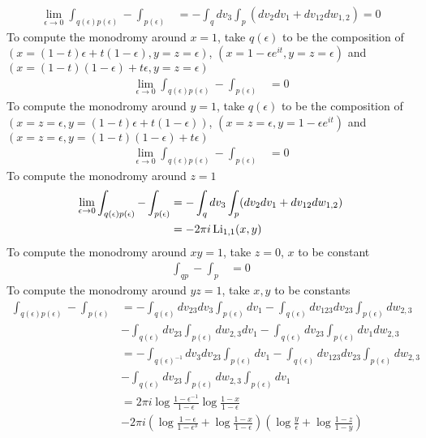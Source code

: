 \documentclass[main]{subfiles}
\begin{document}
\begin{align*}
\lim_{\epsilon\to0}\int_{q(\epsilon)p(\epsilon)}-\int_{p(\epsilon)}&=-\int_qdv_3\int_p(dv_2dv_1+dv_{12}dw_{1,2})=0
\end{align*}
To compute the monodromy around $x=1$, take $q(\epsilon)$ to be the composition of $(x=(1-t)\epsilon+t(1-\epsilon),y=z=\epsilon)$, $(x=1-\epsilon e^{it},y=z=\epsilon)$ and $(x=(1-t)(1-\epsilon)+t\epsilon,y=z=\epsilon)$
\begin{align*}
\lim_{\epsilon\to0}\int_{q(\epsilon)p(\epsilon)}-\int_{p(\epsilon)}&=0
\end{align*}
To compute the monodromy around $y=1$, take $q(\epsilon)$ to be the composition of $(x=z=\epsilon,y=(1-t)\epsilon+t(1-\epsilon))$, $(x=z=\epsilon,y=1-\epsilon e^{it})$ and $(x=z=\epsilon,y=(1-t)(1-\epsilon)+t\epsilon)$
\begin{align*}
\lim_{\epsilon\to0}\int_{q(\epsilon)p(\epsilon)}-\int_{p(\epsilon)}&=0
\end{align*}
To compute the monodromy around $z=1$
\begin{align*}
\lim_{\epsilon\to0}\int_{q(\epsilon)p(\epsilon)}-\int_{p(\epsilon)}&=-\int_qdv_3\int_p(dv_2dv_1+dv_{12}dw_{1,2}) \\
&=-2\pi i\operatorname{Li}_{1,1}(x,y)
\end{align*}
To compute the monodromy around $xy=1$, take $z=0$, $x$ to be constant
\begin{align*}
\int_{qp}-\int_{p}&=0
\end{align*}
To compute the monodromy around $yz=1$, take $x,y$ to be constants
\begin{align*}
\int_{q(\epsilon)p(\epsilon)}-\int_{p(\epsilon)}&=-\int_{q(\epsilon)}dv_{23}dv_3\int_{p(\epsilon)}dv_1-\int_{q(\epsilon)}dv_{123}dv_{23}\int_{p(\epsilon)}dw_{2,3} \\
&-\int_{q(\epsilon)}dv_{23}\int_{p(\epsilon)}dw_{2,3}dv_1-\int_{q(\epsilon)}dv_{23}\int_{p(\epsilon)}dv_1dw_{2,3} \\
&=-\int_{q(\epsilon)^{-1}}dv_3dv_{23}\int_{p(\epsilon)}dv_1-\int_{q(\epsilon)}dv_{123}dv_{23}\int_{p(\epsilon)}dw_{2,3} \\
&-\int_{q(\epsilon)}dv_{23}\int_{p(\epsilon)}dw_{2,3}\int_{p(\epsilon)}dv_1 \\
&=2\pi i\log\frac{1-\epsilon^{-1}}{1-\epsilon}\log\frac{1-x}{1-\epsilon} \\
&-2\pi i\left(\log\frac{1-\epsilon}{1-\epsilon^3}+\log\frac{1-x}{1-\epsilon}\right)\left(\log\frac{y}{\epsilon}+\log\frac{1-z}{1-y}\right) \\
\end{align*}
\end{document}
